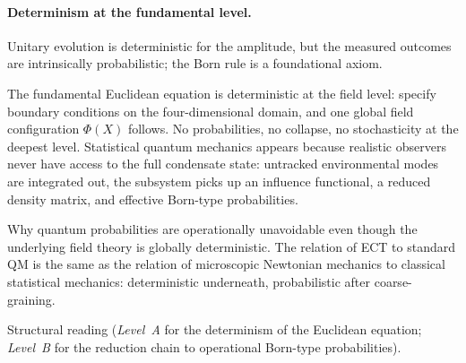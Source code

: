\documentclass[11pt,a4paper]{article}
\begin{document}
\paragraph{Determinism at the fundamental level.}
\begin{description}[leftmargin=2.8cm, style=nextline]
\item[Standard QM.] Unitary evolution is deterministic for the amplitude, but the measured outcomes are intrinsically probabilistic; the Born rule is a foundational axiom.
\item[ECT (physical picture).] The fundamental Euclidean equation is deterministic at the field level: specify boundary conditions on the four-dimensional domain, and one global field configuration $\Phi(X)$ follows.  No probabilities, no collapse, no stochasticity at the deepest level.  Statistical quantum mechanics appears because realistic observers never have access to the full condensate state: untracked environmental modes are integrated out, the subsystem picks up an influence functional, a reduced density matrix, and effective Born-type probabilities.
\item[What this explains.] Why quantum probabilities are operationally unavoidable even though the underlying field theory is globally deterministic.  The relation of ECT to standard QM is the same as the relation of microscopic Newtonian mechanics to classical statistical mechanics: deterministic underneath, probabilistic after coarse-graining.
\item[Status.] Structural reading (\emph{Level~A} for the determinism of the Euclidean equation; \emph{Level~B} for the reduction chain to operational Born-type probabilities).
\end{description}
\end{document}
